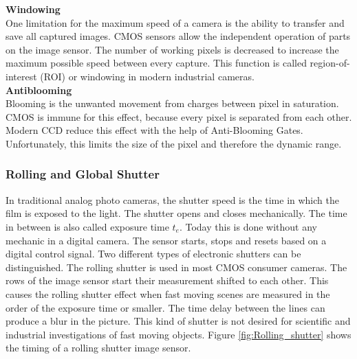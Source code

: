 \textbf{Windowing}\\
One limitation for the maximum speed of a camera is the ability to transfer and save all captured images. CMOS sensors allow the independent operation of parts on the image sensor. The number of working pixels is decreased to increase the maximum possible speed between every capture. This function is called region-of-interest (ROI) or windowing in modern industrial cameras.\\

\textbf{Antiblooming}\\
Blooming is the unwanted movement from charges between pixel in saturation. CMOS is immune for this effect, because every pixel is separated from each other. Modern CCD reduce this effect with the help of Anti-Blooming Gates. Unfortunately, this limits the size of the pixel and therefore the dynamic range.  

\subsubsection{Rolling and Global Shutter}
In traditional analog photo cameras, the shutter speed is the time in which the film is exposed to the light. The shutter opens and closes mechanically. The time in between is also called exposure time $t_e$. Today this is done without any mechanic in a digital camera. The sensor starts, stops and resets based on a digital control signal. Two different types of electronic shutters can be distinguished. The rolling shutter is used in most CMOS consumer cameras. The rows of the image sensor start their measurement shifted to each other. This causes the rolling shutter effect when fast moving scenes are measured in the order of the exposure time or smaller. The time delay between the lines can produce a blur in the picture. This kind of shutter is not desired for scientific and industrial investigations of fast moving objects. Figure \ref{fig:Rolling_shutter} shows the timing of a rolling shutter image sensor. 

